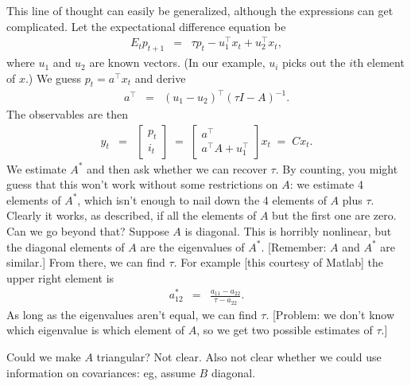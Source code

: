 \documentclass[11pt]{article}
\begin{document}
{\begin{itemize}
This line of thought can easily be generalized,
although the expressions can get complicated.
Let the expectational difference equation be
\begin{eqnarray*}
    E_t p_{t+1} &=& \tau p_t - u_1^\top x_{t} + u_2^\top x_{t} ,
\end{eqnarray*}
where $u_1$ and $u_2$ are known vectors.
(In our example, $u_i$ picks out the $i$th element of $x$.)
We guess $ p_t = a^\top x_t$ and derive
\begin{eqnarray}
    a^\top &=& (u_1 - u_2)^\top (\tau I - A)^{-1} .
\end{eqnarray}
The observables are then
\begin{eqnarray*}
   y_t  &=&
    \left[
        \begin{array}{c}
         p_t \\ i_t
        \end{array}
    \right]
        \;=\;
    \left[
    \begin{array}{c}
         a^\top \\  a^\top A + u_1^\top
    \end{array}
    \right]  x_t
        \;=\;  C x_t.
\end{eqnarray*}
We estimate $A^*$ and then ask whether we can recover $\tau$.
By counting, you might guess that this won't work without some
restrictions on $A$:
we estimate 4 elements of $A^*$, which isn't enough to
nail down the 4 elements of $A$ plus $\tau$.
Clearly it works, as described, if all the elements of $A$
but the first one are zero.
Can we go beyond that?
Suppose $A$ is diagonal.
This is horribly nonlinear,
but the diagonal elements of $A$ are the eigenvalues of $A^*$.
[Remember:  $A$ and $A^*$ are similar.]
From there, we can find $\tau$.
For example [this courtesy of Matlab] the upper right element is
\begin{eqnarray*}
    a^*_{12} &=&  \frac{a_{11}-a_{22}}{\tau - a_{22}} .
\end{eqnarray*}
As long as the eigenvalues aren't equal, we can find $\tau$.
[Problem:  we don't know which eigenvalue is which
element of $A$, so we get two possible estimates of $\tau$.]

Could we make $A$ triangular?  Not clear.
Also not clear whether we could use information on covariances:
eg, assume $B$ diagonal.

\end{itemize}

}
\end{document}
